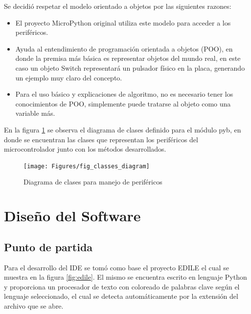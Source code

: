 Se decidió respetar el modelo orientado a objetos por las siguientes razones:

\begin{itemize}
	\item El proyecto MicroPython original utiliza este modelo para acceder a los periféricos.
	\item Ayuda al entendimiento de programación orientada a objetos (POO), en donde la premisa más básica es representar objetos del mundo real, en este caso un objeto Switch representará un pulsador físico en la placa, generando un ejemplo muy claro del concepto.
	\item Para el uso básico y explicaciones de algoritmo, no es necesario tener los conocimientos de POO, simplemente puede tratarse al objeto como una variable más.
\end{itemize}

En la figura \ref{fig:classes} se observa el diagrama de clases definido para el módulo pyb, en donde se encuentran las clases que representan los periféricos del microcontrolador junto con los métodos desarrollados.

\begin{figure}[ht]
  \centering
    \texttt{[image: Figures/fig\_classes\_diagram]}
  \caption{Diagrama de clases para manejo de periféricos}
  \label{fig:classes}
\end{figure}

\section{Diseño del Software}

\subsection{Punto de partida} 

Para el desarrollo del IDE se tomó como base el proyecto EDILE \cite{edile} el cual se muestra en la figura \ref{fig:edile}. El mismo se encuentra escrito en lenguaje Python y proporciona un procesador de texto con coloreado de palabras clave según el lenguaje seleccionado, el cual se detecta automáticamente por la extensión del archivo que se abre.

